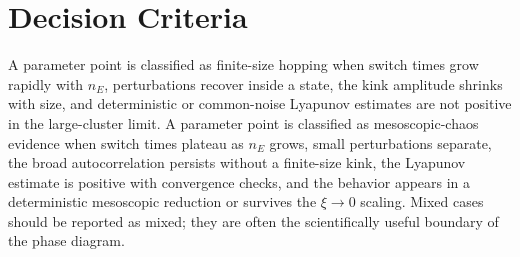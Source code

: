 \section{Decision Criteria}
\label{appC:decision-criteria}

A parameter point is classified as finite-size hopping when switch times grow
rapidly with \(n_E\), perturbations recover inside a state, the kink amplitude
shrinks with size, and deterministic or common-noise Lyapunov estimates are not
positive in the large-cluster limit. A parameter point is classified as
mesoscopic-chaos evidence when switch times plateau as \(n_E\) grows, small
perturbations separate, the broad autocorrelation persists without a
finite-size kink, the Lyapunov estimate is positive with convergence checks,
and the behavior appears in a deterministic mesoscopic reduction or survives
the \(\xi\to 0\) scaling. Mixed cases should be reported as mixed; they are
often the scientifically useful boundary of the phase diagram.
